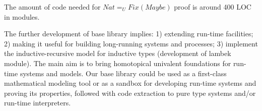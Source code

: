 \documentclass{article}
\begin{document}
The amount of code needed for $Nat =_U Fix(Maybe)$ proof is around 400 LOC in modules.

The further development of base library implies:
1) extending run-time facilities;
2) making it useful for building long-running systems and processes;
3) implement the inductive-recursive model for inductive types (development of lambek module).
The main aim is to bring homotopical univalent foundations for run-time systems and models.
Our base library could be used as a first-class mathematical modeling tool or as a sandbox
for developing run-time systems and proving its properties, followed with code extraction
to pure type systems and/or run-time interpreters.



\end{document}
